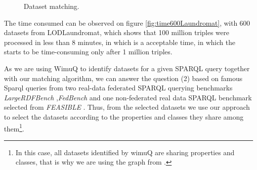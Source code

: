 \begin{figure}[ht!]
     \begin{center}
%
%
    \end{center}
   \label{fig:subfigures}
   \caption{Dataset matching.}
\end{figure}

The time consumed can be observed on figure \ref{fig:time600Laundromat}, with 600 datasets from LODLaundromat\cite{beek2014lod}, which shows that 100 million triples were processed in less than 8 minutes, in which is a acceptable time, in which the starts to be time-consuming only after 1 million triples.

As we are using WimuQ\cite{valdestilhas2019more} to identify datasets for a given SPARQL query together with our matching algorithm, we can answer the question (2) based on famous Sparql queries from two real-data federated SPARQL querying benchmarks \emph{LargeRDFBench} \cite{largerdfbench2017},\emph{FedBench} \cite{fedbench2011} and one non-federated real data SPARQL benchmark selected from \emph{FEASIBLE} \cite{feasible2015}. Thus, from the selected datasets we use our approach to select the datasets according to the properties and classes they share among them\footnote{In this case, all datasets identified by wimuQ are sharing properties and classes, that is why we are using the graph from \cite{valdestilhas2019more}.}.

